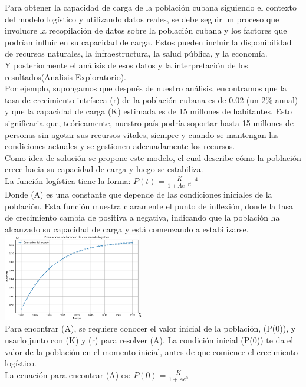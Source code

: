 \documentclass[a4paper,10pt,twocolumn]{article}
\begin{document}
Para obtener la capacidad de carga de la población cubana siguiendo el contexto del modelo logístico y utilizando 
datos reales, se debe seguir un proceso que involucre la recopilación de datos sobre la población cubana y 
los factores que podrían influir en su capacidad de carga. Estos pueden incluir la disponibilidad de recursos 
naturales, la infraestructura, la salud pública, y la economía.\\
Y posteriormente el análisis de esos datos y la interpretación de los resultados(Analisis Exploratorio).\\
Por ejemplo, supongamos que después de nuestro análisis, encontramos que la tasa de crecimiento intríseca (r) de la población 
cubana es de 0.02 (un 2\% anual) y que la capacidad de carga (K) estimada es de 15 millones de habitantes. 
Esto significaria que, teóricamente, nuestro país podría soportar hasta 15 millones de personas sin agotar sus recursos 
vitales, siempre y cuando se mantengan las condiciones actuales y se gestionen adecuadamente los recursos.\\
Como idea de solución se propone este modelo, el cual describe cómo la población crece hacia su capacidad de 
carga y luego se estabiliza.\\ 
\underline{La función logística tiene la forma:} $P(t) = \frac{K}{1 + Ae^{-rt}}$ $^{4}$\\
Donde (A) es una constante que depende de las condiciones iniciales de la población. Esta función muestra claramente 
el punto de inflexión, donde la tasa de crecimiento cambia de positiva a negativa, indicando que la población 
ha alcanzado su capacidad de carga y está comenzando a estabilizarse.
\includegraphics[width=0.45\textwidth]{img/model.png}$^{5}$\\
Para encontrar (A), se requiere conocer el valor inicial de la población, (P(0)), y usarlo junto con (K) y (r) 
para resolver (A). La condición inicial (P(0)) te da el valor de la población en el momento inicial, antes de 
que comience el crecimiento logístico.\\
\underline{La ecuación para encontrar (A) es:} $P(0) = \frac{K}{1 + Ae^{0}}$\\
\end{document}
